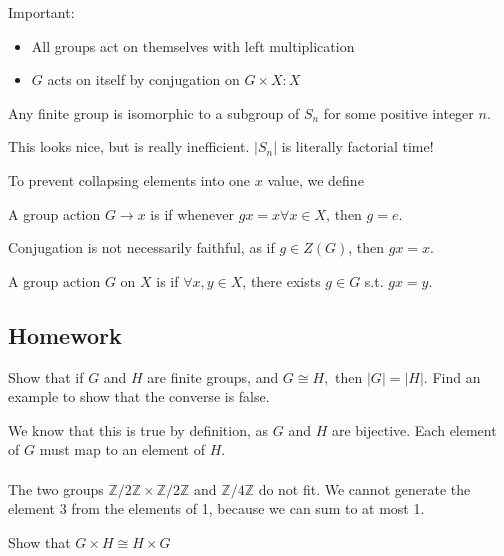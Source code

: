 \documentclass{scrartcl}
\begin{document}
Important: \\
\begin{itemize}
	\item All groups act on themselves with left multiplication
	\item $G$ acts on itself by conjugation on $G \times X : X$
\end{itemize}

\begin{theorem} 
	Any finite group is isomorphic to a subgroup of $S_n$ for some positive integer $n$.
\end{theorem}
This looks nice, but is really inefficient. $|S_n|$ is literally factorial time!

To prevent collapsing elements into one $x$ value, we define
\begin{definition} 
	A group action $G \rightarrow x$ is  if whenever $gx = x \forall x \in X$, then $g = e$.
\end{definition}
Conjugation is not necessarily faithful, as if $g \in Z(G)$, then $gx = x$.

\begin{definition}
	A group action $G$ on $X$ is  if $\forall x,y \in X$, there exists $g \in G$ s.t. $gx=y$.
\end{definition}

\subsection{Homework}
\begin{problem}[1]
	Show that if $G$ and $H$ are finite groups, and $G \cong H,$ then $|G| = |H|.$ Find an example to show that the converse is false.
\end{problem}

\begin{soln}
	We know that this is true by definition, as $G$ and $H$ are bijective. Each element of $G$ must map to an element of $H$. \\ \\
	The two groups $\mathbb{Z} / 2\mathbb{Z} \times \mathbb{Z} / 2\mathbb{Z}$ and $\mathbb{Z} / 4\mathbb{Z}$ do not fit. We cannot generate the element $3$ from the elements of 1, because we can sum to at most 1.
\end{soln}

\begin{problem}[2]
	Show that $G \times H \cong H \times G$
\end{problem}
\end{document}
